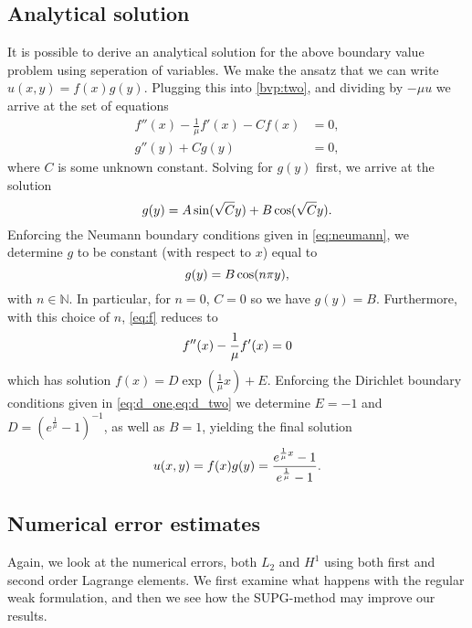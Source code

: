 \documentclass[]{article}
\begin{document}
\subsection*{Analytical solution}
\label{sec:analytical_solution}

It is possible to derive an analytical solution for the above boundary value
problem using seperation of variables. We make the ansatz that we can write
$u(x, y) = f(x)g(y)$. Plugging this into \cref{bvp:two}, and dividing by $-\mu
u$ we arrive at the set of equations
\begin{align}
    f''(x) - \frac{1}{\mu}f'(x) - Cf(x) &= 0, \label{eq:f}\\
    g''(y) + Cg(y) &= 0,
\end{align}
where $C$ is some unknown constant. Solving for $g(y)$ first, we arrive at
the solution
\begin{equation}
    \notag
    g(y) = A\sin(\sqrt{C}y) + B\cos(\sqrt{C}y).
\end{equation}
Enforcing the Neumann boundary conditions given in \cref{eq:neumann}, we
determine $g$ to be constant (with respect to $x$) equal to 
\begin{equation}
    \notag
    g(y) = B\cos(n\pi y), 
\end{equation}
with $n \in \mathbb{N}$. In particular, for $n = 0$, $C = 0$ so we have $g(y) = B$. Furthermore, with this choice of $n$, \cref{eq:f} reduces to
\begin{equation}
    \notag
    f''(x) - \frac{1}{\mu}f'(x) = 0
\end{equation}
which has solution $ f(x) = D \exp(\frac{1}{\mu}x) + E$.  Enforcing the Dirichlet
boundary conditions given in \cref{eq:d_one,eq:d_two} we determine $E = -1$ and
$D = (e^{\frac{1}{\mu}} - 1)^{-1}$, as well as $B = 1$, yielding the final
solution
\begin{equation}
    \notag
    u(x, y) = f(x)g(y) = \frac{e^{\frac{1}{\mu}x} - 1}{e^{\frac{1}{\mu}} - 1}.
\end{equation}

\subsection*{Numerical error estimates}

Again, we look at the numerical errors, both $L_2$ and $H^1$ using both first
and second order Lagrange elements. We first examine what happens with the
regular weak formulation, and then we see how the SUPG-method may improve our
results. 
\end{document}
